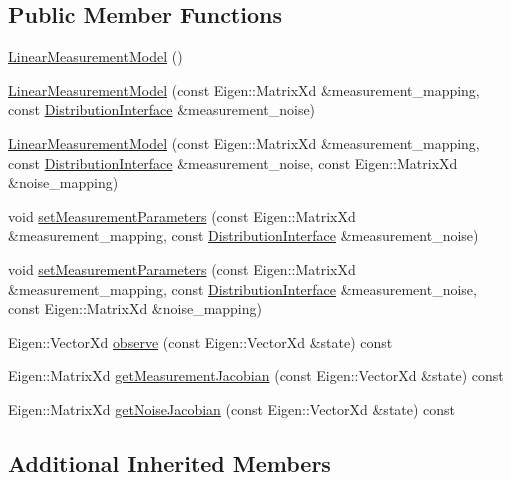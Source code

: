 \subsection*{Public Member Functions}
\begin{DoxyCompactItemize}
\item 
\hyperlink{classrefill_1_1LinearMeasurementModel_a90e4ff5a3fd39b3c727b389320ec1e41}{Linear\+Measurement\+Model} ()
\item 
\hyperlink{classrefill_1_1LinearMeasurementModel_ab1b3cb8e8a8e6bc1f311b9cdb96da8b7}{Linear\+Measurement\+Model} (const Eigen\+::\+Matrix\+Xd \&measurement\+\_\+mapping, const \hyperlink{classrefill_1_1DistributionInterface}{Distribution\+Interface} \&measurement\+\_\+noise)
\item 
\hyperlink{classrefill_1_1LinearMeasurementModel_a62be4c770b995a76d9ddf2b8c1e39b4b}{Linear\+Measurement\+Model} (const Eigen\+::\+Matrix\+Xd \&measurement\+\_\+mapping, const \hyperlink{classrefill_1_1DistributionInterface}{Distribution\+Interface} \&measurement\+\_\+noise, const Eigen\+::\+Matrix\+Xd \&noise\+\_\+mapping)
\item 
void \hyperlink{classrefill_1_1LinearMeasurementModel_a4086510d927ce6ad15a94fe7d4fd1a71}{set\+Measurement\+Parameters} (const Eigen\+::\+Matrix\+Xd \&measurement\+\_\+mapping, const \hyperlink{classrefill_1_1DistributionInterface}{Distribution\+Interface} \&measurement\+\_\+noise)
\item 
void \hyperlink{classrefill_1_1LinearMeasurementModel_aa514c963fd37c9aed1b2f60f833fa472}{set\+Measurement\+Parameters} (const Eigen\+::\+Matrix\+Xd \&measurement\+\_\+mapping, const \hyperlink{classrefill_1_1DistributionInterface}{Distribution\+Interface} \&measurement\+\_\+noise, const Eigen\+::\+Matrix\+Xd \&noise\+\_\+mapping)
\item 
Eigen\+::\+Vector\+Xd \hyperlink{classrefill_1_1LinearMeasurementModel_a01404c7ce5395e586738d73213c89e59}{observe} (const Eigen\+::\+Vector\+Xd \&state) const 
\item 
Eigen\+::\+Matrix\+Xd \hyperlink{classrefill_1_1LinearMeasurementModel_a84f3241d0ced9d0b017b498bfed438eb}{get\+Measurement\+Jacobian} (const Eigen\+::\+Vector\+Xd \&state) const 
\item 
Eigen\+::\+Matrix\+Xd \hyperlink{classrefill_1_1LinearMeasurementModel_ab31ce79fd4d2c62717443a052249f8f6}{get\+Noise\+Jacobian} (const Eigen\+::\+Vector\+Xd \&state) const 
\end{DoxyCompactItemize}
\subsection*{Additional Inherited Members}


